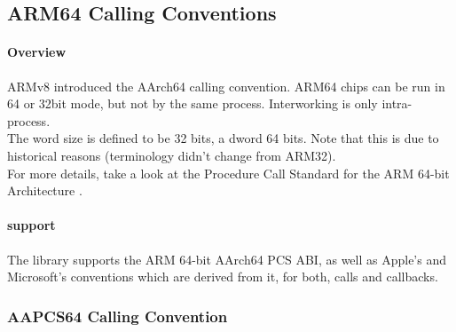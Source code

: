 %
%
%
%

\subsection{ARM64 Calling Conventions}

\paragraph{Overview}

ARMv8 introduced the AArch64 calling convention. ARM64 chips can be run in 64 or 32bit mode, but not by the same process. Interworking is only intra-process.\\
The word size is defined to be 32 bits, a dword 64 bits. Note that this is due to historical reasons (terminology didn't change from ARM32).\\
For more details, take a look at the Procedure Call Standard for the ARM 64-bit Architecture \cite{AAPCS64}.\\

\paragraph{ support}

The  library supports the ARM 64-bit AArch64 PCS ABI, as well as Apple's and Microsoft's conventions which are derived from it, for both, calls and callbacks.

\subsubsection{AAPCS64 Calling Convention}

